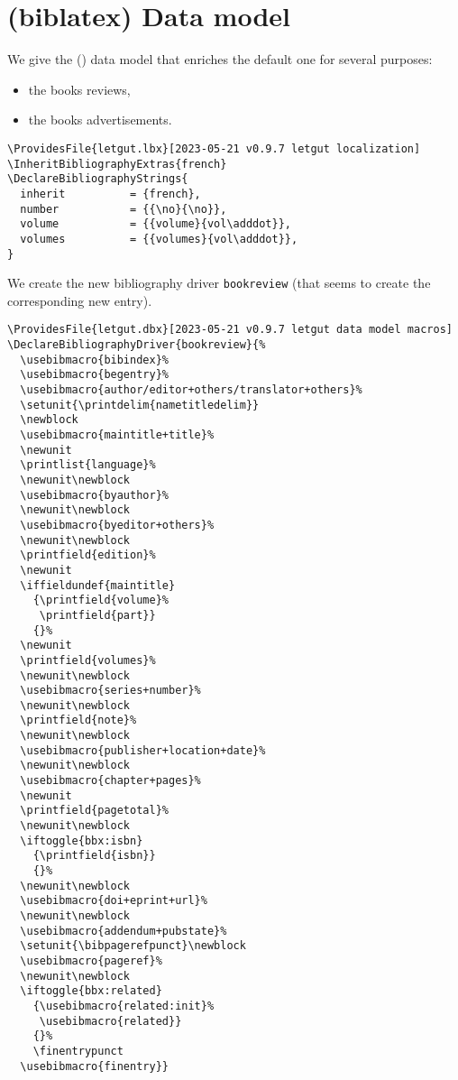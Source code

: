 \documentclass{letgut}
\begin{document}
\section{(biblatex) Data model}
\label{biblatexDatamodel-vx7h55h0jlj0}
We give the () data model that enriches the default one for
several purposes:
\begin{itemize}
\item the books reviews,
\item the books advertisements.
\end{itemize}

\begin{lstlisting}
\ProvidesFile{letgut.lbx}[2023-05-21 v0.9.7 letgut localization]
\InheritBibliographyExtras{french}
\DeclareBibliographyStrings{
  inherit          = {french},
  number           = {{\no}{\no}},
  volume           = {{volume}{vol\adddot}},
  volumes          = {{volumes}{vol\adddot}},
}
\end{lstlisting}

We create the new bibliography driver \lstinline+bookreview+ (that seems to
create the corresponding new entry).

\begin{lstlisting}
\ProvidesFile{letgut.dbx}[2023-05-21 v0.9.7 letgut data model macros]
\DeclareBibliographyDriver{bookreview}{%
  \usebibmacro{bibindex}%
  \usebibmacro{begentry}%
  \usebibmacro{author/editor+others/translator+others}%
  \setunit{\printdelim{nametitledelim}}
  \newblock
  \usebibmacro{maintitle+title}%
  \newunit
  \printlist{language}%
  \newunit\newblock
  \usebibmacro{byauthor}%
  \newunit\newblock
  \usebibmacro{byeditor+others}%
  \newunit\newblock
  \printfield{edition}%
  \newunit
  \iffieldundef{maintitle}
    {\printfield{volume}%
     \printfield{part}}
    {}%
  \newunit
  \printfield{volumes}%
  \newunit\newblock
  \usebibmacro{series+number}%
  \newunit\newblock
  \printfield{note}%
  \newunit\newblock
  \usebibmacro{publisher+location+date}%
  \newunit\newblock
  \usebibmacro{chapter+pages}%
  \newunit
  \printfield{pagetotal}%
  \newunit\newblock
  \iftoggle{bbx:isbn}
    {\printfield{isbn}}
    {}%
  \newunit\newblock
  \usebibmacro{doi+eprint+url}%
  \newunit\newblock
  \usebibmacro{addendum+pubstate}%
  \setunit{\bibpagerefpunct}\newblock
  \usebibmacro{pageref}%
  \newunit\newblock
  \iftoggle{bbx:related}
    {\usebibmacro{related:init}%
     \usebibmacro{related}}
    {}%
    \finentrypunct
  \usebibmacro{finentry}}
\end{lstlisting}
\end{document}
